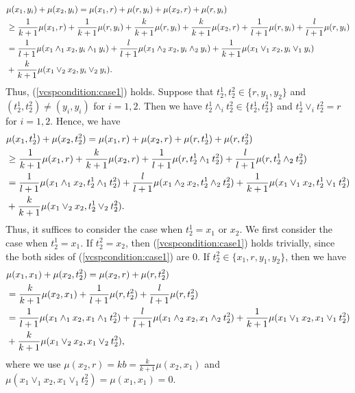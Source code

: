 \documentclass[11pt]{article}
\theoremstyle{definition}
\begin{document}
\begin{align}
    &\mu(x_1,y_i)+\mu(x_2,y_i)= \mu(x_1,r)+\mu(r,y_i)+\mu(x_2,r)+\mu(r,y_i)\notag\\
    &\geq \frac{1}{k+1} \mu(x_1,r)+\frac{1}{k+1} \mu(r,y_i)+\frac{k}{k+1} \mu(r,y_i)+\frac{k}{k+1} \mu(x_2,r)+\frac{1}{l+1} \mu(r,y_i)+\frac{l}{l+1} \mu(r,y_i)\notag\\
    &=\frac{1}{l+1} \mu(x_1\wedge_1 x_2,y_i\wedge_1 y_i)+\frac{l}{l+1} \mu(x_1\wedge_2 x_2,y_i\wedge_2 y_i)+\frac{1}{k+1} \mu(x_1\vee_1 x_2,y_i\vee_1 y_i)\notag\\
    &+\frac{k}{k+1} \mu(x_1\vee_2 x_2,y_i\vee_2 y_i).
\end{align}
Thus, (\ref{vcspcondition:case1}) holds. Suppose that $t_2^1,t_2^2\in \{r,y_1,y_2\}$ and $(t_2^1,t_2^2)\neq (y_i,y_i)$ for $i=1,2$. Then we have $t_2^1\wedge_i t_2^2\in \{t_2^1,t_2^2\}$ and $t_2^1\vee_i t_2^2=r$ for $i=1,2$. Hence, we have
\begin{align}
    &\mu(x_1,t_2^1)+\mu(x_2,t_2^2)= \mu(x_1,r)+\mu(x_2,r)+\mu(r,t_2^1)+\mu(r,t_2^2)\notag\\
    &\geq \frac{1}{k+1} \mu(x_1,r)+\frac{k}{k+1} \mu(x_2,r)+\frac{1}{l+1} \mu(r,t_2^1\wedge_1 t_2^2)+\frac{l}{l+1} \mu(r,t_2^1\wedge_2 t_2^2)\notag\\
    &= \frac{1}{l+1} \mu(x_1\wedge_1 x_2,t_2^1\wedge_1 t_2^2)+\frac{l}{l+1} \mu(x_1\wedge_2 x_2,t_2^1\wedge_2 t_2^2)+\frac{1}{k+1} \mu(x_1\vee_1 x_2,t_2^1\vee_1 t_2^2)\notag\\
    &+\frac{k}{k+1} \mu(x_1\vee_2 x_2,t_2^1\vee_2 t_2^2).
\end{align}
Thus, it suffices to consider the case when $t_2^1=x_1$ or $x_2$. We first consider the case when $t_2^1=x_1$. If $t_2^2=x_2$, then (\ref{vcspcondition:case1}) holds trivially, since the both sides of (\ref{vcspcondition:case1}) are 0. If $t_2^2\in \{x_1,r,y_1,y_2\}$, then we have
\begin{align}
    &\mu(x_1,x_1)+\mu(x_2,t_2^2)=\mu(x_2,r)+\mu(r,t_2^2)\notag\\
    &=\frac{k}{k+1}\mu(x_2,x_1)+\frac{1}{l+1}\mu(r,t_2^2)+\frac{l}{l+1}\mu(r,t_2^2) \notag\\
    &=\frac{1}{l+1} \mu(x_1\wedge_1 x_2,x_1\wedge_1 t_2^2)+\frac{l}{l+1} \mu(x_1\wedge_2 x_2,x_1\wedge_2 t_2^2)+\frac{1}{k+1} \mu(x_1\vee_1 x_2,x_1\vee_1 t_2^2)\notag\\
    &+\frac{k}{k+1} \mu(x_1\vee_2 x_2,x_1\vee_2 t_2^2),
\end{align}
where we use $\mu(x_2,r)=kb=\frac{k}{k+1}\mu(x_2,x_1)$ and $\mu(x_1\vee_1 x_2,x_1\vee_1 t_2^2)=\mu(x_1,x_1)=0$.
\end{document}
